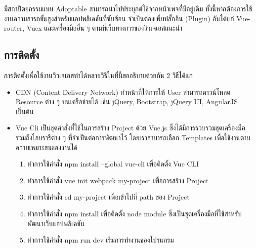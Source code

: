 		มีสถาปัตยกรรมแบบ Adoptable สามารถนำไปประยุกต์ใช้จากหน้าเพจที่มีอยู่เดิม ทั้งนี้หากต้องการใช้งานความสารถขั้นสูงสำหรับแอปพลิเคชันที่ซับซ้อน จำเป็นต้องเพิ่มปลั๊กอิน (Plugin) อันได้แก่ Vue-router, Vuex และเครื่องมืออื่น ๆ ตามที่เว็บทางการของวิวเจเอสแนะนำ
		
		\subsection{การติดตั้ง}
		การติดตั้งเพื่อใช้งานวิวเจเอสทำได้หลายวิธีในที่นี้ขออธิบายด้วยกัน 2 วิธีได้แก่
			\begin{itemize}
				\item CDN (Content Delivery Network) ทำหน้าที่ให้การให้ User สามารถดาวน์โหลด Resource ต่าง ๆ บนเครือข่ายได้ เช่น jQuery, Bootstrap, jQuery UI, AngularJS เป็นต้น 
				\item Vue Cli เป็นชุดคำสั่งที่ใช้ในการสร้าง Project ด้วย Vue.js ซึ่งได้มีการรวบรวมชุดเครื่องมือรวมถึงไลบรารีต่าง ๆ ที่จำเป็นต่อการพัฒนาไว้ โดยเราสามารถเลือก Templates เพื่อใช้งานตามความเหมาะสมของงานได้
				\begin{enumerate} [label={\arabic*}.]
					\item ทำการใช้คำสั่ง npm install --global vue-cli เพื่อติดตั้ง Vue CLI
					\item ทำการใช้คำสั่ง vue init webpack my-project เพื่อการสร้าง Project 
					\item ทำการใช้คำสั่ง cd my-project เพื่อเข้าไปที่ path ของ Project
					\item ทำการใช้คำสั่ง npm install เพื่อติดตั้ง node module ซึ่งเป็นชุดเครื่องมือที่ใช้สำหรับพัฒนาเว็บแอปพลิเคชัน
					\item ทำการใช้คำสั่ง npm run dev เริ่มการทำงานของโปรแกรม
				\end{enumerate}
			\end{itemize}
		

